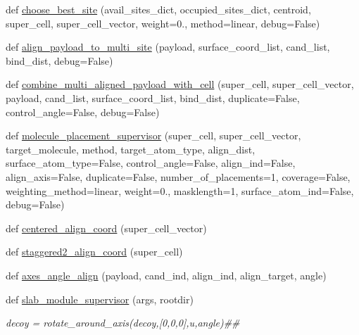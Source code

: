 \begin{DoxyCompactItemize}
\item 
def \hyperlink{namespacemolSimplify_1_1Scripts_1_1cellbuilder_ad6dfd641de36df3deee44b6d36cbe37b}{choose\+\_\+best\+\_\+site} (avail\+\_\+sites\+\_\+dict, occupied\+\_\+sites\+\_\+dict, centroid, super\+\_\+cell, super\+\_\+cell\+\_\+vector, weight=0., method=\textquotesingle{}linear\textquotesingle{}, debug=False)
\item 
def \hyperlink{namespacemolSimplify_1_1Scripts_1_1cellbuilder_a4e195986d1218f5cea61303115a7497e}{align\+\_\+payload\+\_\+to\+\_\+multi\+\_\+site} (payload, surface\+\_\+coord\+\_\+list, cand\+\_\+list, bind\+\_\+dist, debug=False)
\item 
def \hyperlink{namespacemolSimplify_1_1Scripts_1_1cellbuilder_a2b44744a99a947b361f969086adf0bba}{combine\+\_\+multi\+\_\+aligned\+\_\+payload\+\_\+with\+\_\+cell} (super\+\_\+cell, super\+\_\+cell\+\_\+vector, payload, cand\+\_\+list, surface\+\_\+coord\+\_\+list, bind\+\_\+dist, duplicate=False, control\+\_\+angle=False, debug=False)
\item 
def \hyperlink{namespacemolSimplify_1_1Scripts_1_1cellbuilder_aa9abfba7f941a53e708aa37cafbaf039}{molecule\+\_\+placement\+\_\+supervisor} (super\+\_\+cell, super\+\_\+cell\+\_\+vector, target\+\_\+molecule, method, target\+\_\+atom\+\_\+type, align\+\_\+dist, surface\+\_\+atom\+\_\+type=False, control\+\_\+angle=False, align\+\_\+ind=False, align\+\_\+axis=False, duplicate=False, number\+\_\+of\+\_\+placements=1, coverage=False, weighting\+\_\+method=\textquotesingle{}linear\textquotesingle{}, weight=0., masklength=1, surface\+\_\+atom\+\_\+ind=False, debug=False)
\item 
def \hyperlink{namespacemolSimplify_1_1Scripts_1_1cellbuilder_a54eec5e9248ff10c929f509c4eb88d51}{centered\+\_\+align\+\_\+coord} (super\+\_\+cell\+\_\+vector)
\item 
def \hyperlink{namespacemolSimplify_1_1Scripts_1_1cellbuilder_a1201d9017220e5c76045362619788e67}{staggered2\+\_\+align\+\_\+coord} (super\+\_\+cell)
\item 
def \hyperlink{namespacemolSimplify_1_1Scripts_1_1cellbuilder_a77ede2b6a17b1fb9bcc8fd2304161e0c}{axes\+\_\+angle\+\_\+align} (payload, cand\+\_\+ind, align\+\_\+ind, align\+\_\+target, angle)
\item 
def \hyperlink{namespacemolSimplify_1_1Scripts_1_1cellbuilder_a53d176a8ed9d1d9153910e11614c8ecb}{slab\+\_\+module\+\_\+supervisor} (args, rootdir)
\begin{DoxyCompactList}\small\item\em decoy = rotate\+\_\+around\+\_\+axis(decoy,\mbox{[}0,0,0\mbox{]},u,angle)\#\# \end{DoxyCompactList}\end{DoxyCompactItemize}


